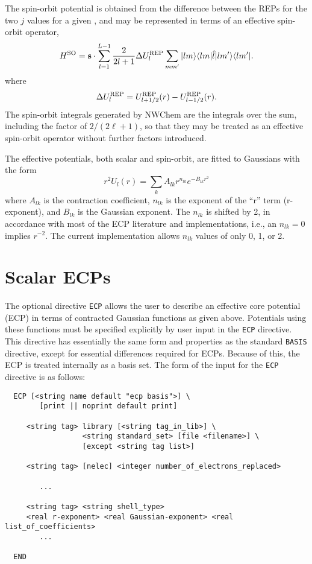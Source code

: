The spin-orbit potential is obtained from the difference between the REPs
for the two $j$ values for a given \ell, and may be 
represented in terms of an effective spin-orbit operator,
\begin{equation}
H^{\rm SO} = {\bf s} \cdot \sum_{\ell=1}^{L-1} \frac{2}{2\ell+1} 
\Delta U^{\rm REP}_{\ell} \sum_{mm'} 
| \ell m \rangle \langle \ell m | \hat\ell | \ell m' \rangle \langle \ell m' |.
\end{equation}
where
\begin{equation}
\Delta U^{\rm REP}_{\ell} = U^{\rm REP}_{\ell+1/2}(r)
 - U^{\rm REP}_{\ell-1/2}(r).
\end{equation}
The spin-orbit integrals generated by NWChem are the integrals over the sum,
including the factor of $2/(2\ell+1)$, so that they may be treated as an
effective spin-orbit operator without further factors introduced.

The effective potentials, both scalar and spin-orbit, are fitted to
Gaussians with the form
\[
 r^2U_l(r) = \sum_{k} A_{lk} r^{n_{lk}} e^{-B_{lk}r^{2}}
\]
where $A_{lk}$ is the contraction coefficient, $n_{lk}$ is the
exponent of the ``r'' term (r-exponent), and $B_{lk}$ is the Gaussian
exponent.  The $n_{lk}$ is shifted by 2, in accordance with most of the ECP
literature and implementations, i.e., an $n_{lk} = 0$ implies
$r^{-2}$.  The current implementation allows $n_{lk}$ values
of only 0, 1, or 2. 

\section{Scalar ECPs}
\label{sec:scalar_ecp}

The optional directive \verb+ECP+ allows the user to describe an effective core
potential (ECP) in terms of contracted Gaussian functions as given above.
Potentials using these functions must be specified explicitly by user input
in the \verb+ECP+ directive.  This directive has essentially the same form
and properties as the standard \verb+BASIS+ directive, except for essential
differences required for ECPs.  Because of this, the ECP is treated
internally as a basis set. The form of the input for the
\verb+ECP+ directive is as follows:


\begin{verbatim}
  ECP [<string name default "ecp basis">] \
        [print || noprint default print]

     <string tag> library [<string tag_in_lib>] \
                  <string standard_set> [file <filename>] \
                  [except <string tag list>]

     <string tag> [nelec] <integer number_of_electrons_replaced>
 
        ...

     <string tag> <string shell_type>
     <real r-exponent> <real Gaussian-exponent> <real list_of_coefficients>
        ...
     
  END
\end{verbatim}    

